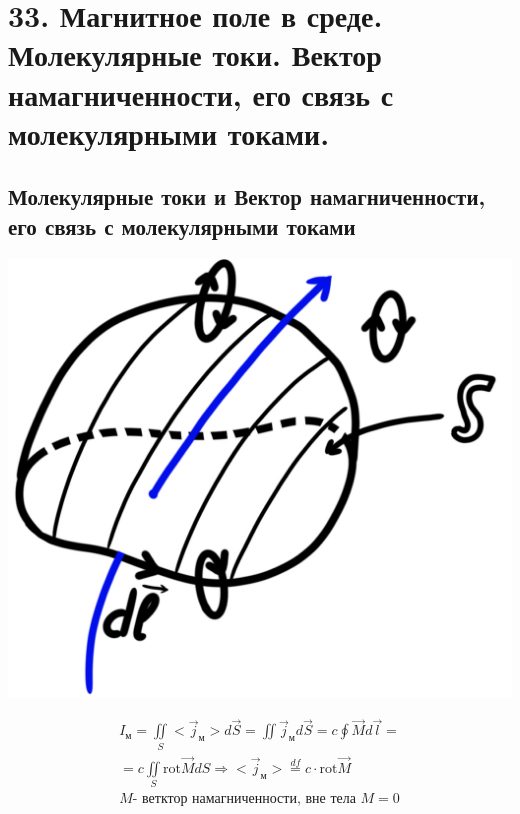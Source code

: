 \section*{33. Магнитное поле в среде. Молекулярные токи. Вектор намагниченности,
его связь с молекулярными токами.}

\subsection*{Молекулярные токи и Вектор намагниченности,
его связь с молекулярными токами}

\begin{minipage}[c]{0.25\textwidth} %
    \includegraphics[width=\textwidth]{im/72.png} %
\end{minipage}%
\hfill
\begin{minipage}[c]{0.7\textwidth} %
    \begin{gather*}
        I_{\text{м}}=\underset{S}{\iint} <\vec{j}_{\text{м}}>d\vec{S}=\iint \vec{j}_{\text{м}}d\vec{S}=c\oint \vec{M}d\vec{l}= \\
        =c\underset{S}{\iint}\mathrm{rot}\vec{M}dS \Rightarrow <\vec{j}_{\text{м}}>\overset{df}{=}c\cdot \mathrm{rot}\vec{M} \\
        M\text{- ветктор намагниченности, вне тела } M=0
    \end{gather*}
\end{minipage}

